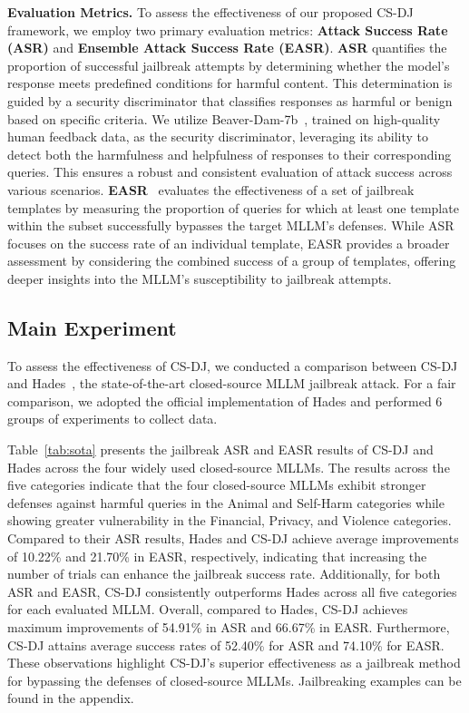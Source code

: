 \noindent \textbf{Evaluation Metrics.} To assess the effectiveness of our proposed CS-DJ framework, we employ two primary evaluation metrics: \textbf{Attack Success Rate (ASR)} and \textbf{Ensemble Attack Success Rate (EASR)}.
\textbf{ASR} quantifies the proportion of successful jailbreak attempts by determining whether the model’s response meets predefined conditions for harmful content. This determination is guided by a security discriminator that classifies responses as harmful or benign based on specific criteria. We utilize Beaver-Dam-7b~\cite{ji2024beavertails}, trained on high-quality human feedback data, as the security discriminator, leveraging its ability to detect both the harmfulness and helpfulness of responses to their corresponding queries. This ensures a robust and consistent evaluation of attack success across various scenarios.
\textbf{EASR}~\cite{yu2024llm} evaluates the effectiveness of a set of jailbreak templates by measuring the proportion of queries for which at least one template within the subset successfully bypasses the target MLLM’s defenses. While ASR focuses on the success rate of an individual template, EASR provides a broader assessment by considering the combined success of a group of templates, offering deeper insights into the MLLM’s susceptibility to jailbreak attempts.


\subsection{Main Experiment}


To assess the effectiveness of CS-DJ, we conducted a comparison between CS-DJ and Hades~\cite{li2024images}, the state-of-the-art closed-source MLLM jailbreak attack. For a fair comparison, we adopted the official implementation of Hades and performed 6 groups of experiments to collect data.


Table~\ref{tab:sota} presents the jailbreak ASR and EASR results of CS-DJ and Hades across the four widely used closed-source MLLMs. The results across the five categories indicate that the four closed-source MLLMs exhibit stronger defenses against harmful queries in the Animal and Self-Harm categories while showing greater vulnerability in the Financial, Privacy, and Violence categories. Compared to their ASR results, Hades and CS-DJ achieve average improvements of 10.22\% and 21.70\% in EASR, respectively, indicating that increasing the number of trials can enhance the jailbreak success rate. Additionally, for both ASR and EASR, CS-DJ consistently outperforms Hades across all five categories for each evaluated MLLM. Overall, compared to Hades, CS-DJ achieves maximum improvements of 54.91\% in ASR and 66.67\% in EASR. Furthermore, CS-DJ attains average success rates of 52.40\% for ASR and 74.10\% for EASR.  These observations highlight CS-DJ’s superior effectiveness as a jailbreak method for bypassing the defenses of closed-source MLLMs. Jailbreaking examples can be found in the appendix.


